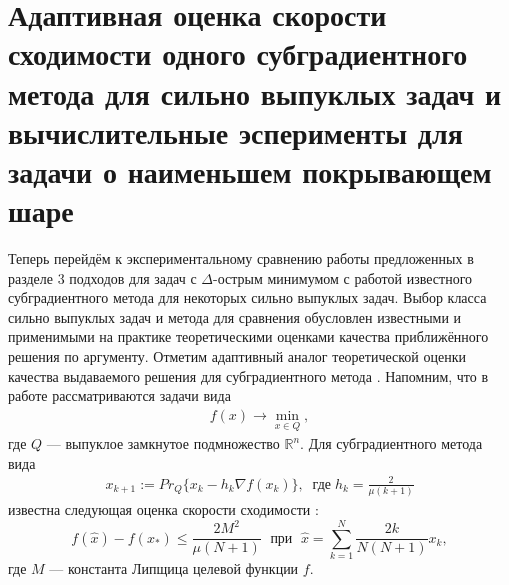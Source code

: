 \section{Адаптивная оценка скорости сходимости одного субградиентного метода для сильно выпуклых задач и вычислительные эсперименты для задачи о наименьшем покрывающем шаре}  \label{sec:ch2/sec3}

    Теперь перейдём к экспериментальному сравнению работы предложенных в разделе 3 подходов для задач с $\Delta$-острым минимумом с работой известного субградиентного метода \cite{Bach_2012} для некоторых сильно выпуклых задач. Выбор класса сильно выпуклых задач и метода \cite{Bach_2012} для сравнения обусловлен известными и  применимыми на практике теоретическими оценками качества приближённого решения по аргументу. Отметим адаптивный аналог \cite{Stonyakin_2021} теоретической оценки качества выдаваемого решения для субградиентного метода \cite{Bach_2012}. Напомним, что в работе рассматриваются задачи вида
    \begin{gather}\label{min_q}
        f(x)\rightarrow\min_{x\in Q},
    \end{gather}
    где $Q$ --- выпуклое замкнутое подмножество $\mathbb{R}^{n}$. Для субградиентного метода вида
    \begin{gather}\label{orig}
        x_{k+1} := Pr_{Q}\{x_k - h_k \nabla f(x_k) \}, \;\; \textit{где} \; h_k = \frac{2}{\mu (k+1)}
    \end{gather}
    известна следующая оценка скорости сходимости \cite{Bach_2012}:
    \begin{equation}\label{orig_estimation_f}
        f(\widehat{x}) - f(x_*) \leq \frac{2 M^2}{\mu (N+1)}  \; \text{  при   } \; \widehat{x} = \sum\limits_{k=1}^{N} \frac{2 k}{N (N+1)} x_k, 
    \end{equation}
    где $M$ --- константа Липщица целевой функции $f$.

